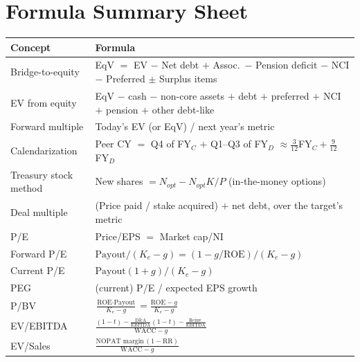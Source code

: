 \section{Formula Summary Sheet}
\begin{center}
\small
\renewcommand{\arraystretch}{1.5}
\begin{longtable}{@{}p{4.6cm}p{10.4cm}@{}}
\toprule
\textbf{Concept} & \textbf{Formula}\\
\midrule
\endhead
Bridge-to-equity & EqV $=$ EV $-$ Net debt $+$ Assoc.\ $-$ Pension deficit $-$ NCI $-$ Preferred $\pm$ Surplus items\\
EV from equity & EqV $-$ cash $-$ non-core assets $+$ debt $+$ preferred $+$ NCI $+$ pension $+$ other debt-like\\
Forward multiple & Today's EV (or EqV) / next year's metric\\
Calendarization & Peer CY $=$ Q4 of FY$_C$ $+$ Q1--Q3 of FY$_D$ $\approx\frac{3}{12}$FY$_C+\frac{9}{12}$FY$_D$\\
Treasury stock method & New shares $=N_{opt}-N_{opt}K/P$ (in-the-money options)\\
Deal multiple & (Price paid / stake acquired) $+$ net debt, over the target's metric\\
P/E & Price/EPS $=$ Market cap/NI\\
Forward P/E & $\text{Payout}/(K_e-g)=(1-g/\text{ROE})/(K_e-g)$\\
Current P/E & $\text{Payout}(1+g)/(K_e-g)$\\
PEG & (current) P/E / expected EPS growth\\
P/BV & $\frac{\text{ROE}\cdot\text{Payout}}{K_e-g}=\frac{\text{ROE}-g}{K_e-g}$\\
EV/EBITDA & $\frac{(1-t)-\frac{\text{D\&A}}{\text{EBITDA}}(1-t)-\frac{\text{Reinv.}}{\text{EBITDA}}}{\text{WACC}-g}$\\
EV/Sales & $\frac{\text{NOPAT margin}\,(1-\text{RR})}{\text{WACC}-g}$\\
\bottomrule
\end{longtable}
\end{center}

